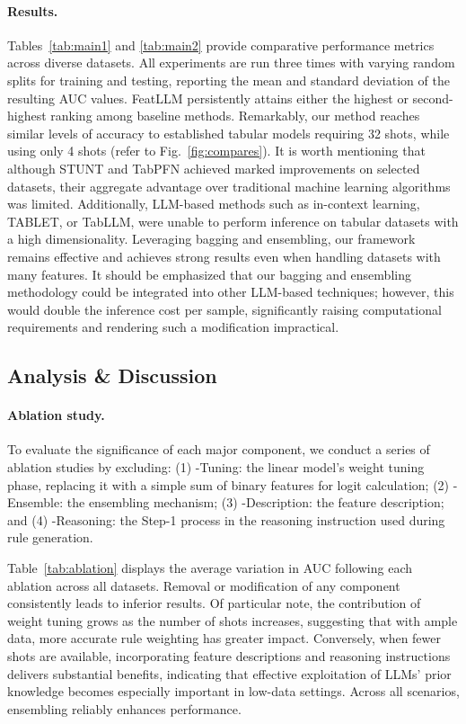 \vspace*{-0.12in}
\paragraph{Results.}
Tables~\ref{tab:main1} and \ref{tab:main2} provide comparative performance metrics across diverse datasets. All experiments are run three times with varying random splits for training and testing, reporting the mean and standard deviation of the resulting AUC values. \textsf{FeatLLM} persistently attains either the highest or second-highest ranking among baseline methods. Remarkably, our method reaches similar levels of accuracy to established tabular models requiring 32 shots, while using only 4 shots (refer to Fig.~\ref{fig:compares}). It is worth mentioning that although STUNT and TabPFN achieved marked improvements on selected datasets, their aggregate advantage over traditional machine learning algorithms was limited. Additionally, LLM-based methods such as in-context learning, TABLET, or TabLLM, were unable to perform inference on tabular datasets with a high dimensionality. Leveraging bagging and ensembling, our framework remains effective and achieves strong results even when handling datasets with many features. It should be emphasized that our bagging and ensembling methodology could be integrated into other LLM-based techniques; however, this would double the inference cost per sample, significantly raising computational requirements and rendering such a modification impractical.

\subsection{Analysis \& Discussion}
\label{sec:analysis}
\paragraph{Ablation study.} To evaluate the significance of each major component, we conduct a series of ablation studies by excluding: (1) \textsf{-Tuning}: the linear model's weight tuning phase, replacing it with a simple sum of binary features for logit calculation; (2) \textsf{-Ensemble}: the ensembling mechanism; (3) \textsf{-Description}: the feature description; and (4) \textsf{-Reasoning}: the Step-1 process in the reasoning instruction used during rule generation.

Table~\ref{tab:ablation} displays the average variation in AUC following each ablation across all datasets. Removal or modification of any component consistently leads to inferior results. Of particular note, the contribution of weight tuning grows as the number of shots increases, suggesting that with ample data, more accurate rule weighting has greater impact. Conversely, when fewer shots are available, incorporating feature descriptions and reasoning instructions delivers substantial benefits, indicating that effective exploitation of LLMs' prior knowledge becomes especially important in low-data settings. Across all scenarios, ensembling reliably enhances performance.

